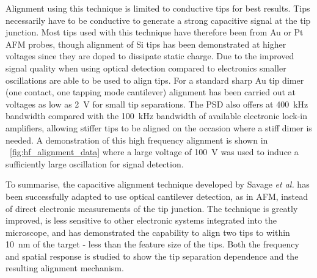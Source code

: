 \documentclass{article}
\begin{document}
Alignment using this technique is limited to conductive tips for best results. Tips necessarily have to be conductive to generate a strong capacitive signal at the tip junction. Most tips used with this technique have therefore been from Au or Pt AFM probes, though alignment of Si tips has been demonstrated at higher voltages since they are doped to dissipate static charge. Due to the improved signal quality when using optical detection compared to electronics smaller oscillations are able to be used to align tips. For a standard sharp Au tip dimer (one contact, one tapping mode cantilever) alignment has been carried out at voltages as low as \SI{2}{V} for small tip separations. The PSD also offers at \SI{400}{kHz} bandwidth compared with the \SI{100}{kHz} bandwidth of available electronic lock-in amplifiers, allowing stiffer tips to be aligned on the occasion where a stiff dimer is needed. A demonstration of this high frequency alignment is shown in \figurename~\ref{fig:hf_alignment_data} where a large voltage of \SI{100}{V} was used to induce a sufficiently large oscillation for signal detection.

To summarise, the capacitive alignment technique developed by Savage \textit{et al.} \cite{savage2011} has been successfully adapted to use optical cantilever detection, as in AFM, instead of direct electronic measurements of the tip junction. The technique is greatly improved, is less sensitive to other electronic systems integrated into the microscope, and has demonstrated the capability to align two tips to within \SI{10}{nm} of the target - less than the feature size of the tips. Both the frequency and spatial response is studied to show the tip separation dependence and the resulting alignment mechanism.
\end{document}
